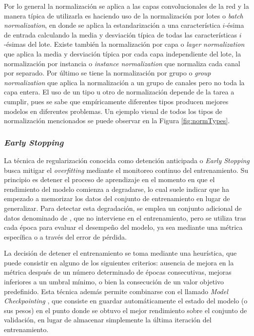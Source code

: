Por lo general la normalización se aplica a las capas convolucionales de la red y la manera típica de utilizarla es haciendo uso de la normalización por lotes o \textit{batch normalization}, en donde se aplica la estandarización a una característica $i$-ésima de entrada calculando la media y desviación típica de todas las características $i$-ésimas del lote. Existe también la normalización por capa o \textit{layer normalization} que aplica la media y desviación típica por cada capa independiente del lote, la normalización por instancia o \textit{instance normalization} que normaliza cada canal por separado. Por último se tiene la normalización por grupo o \textit{group normalization} que aplica la normalización a un grupo de canales pero no toda la capa entera. El uso de un tipo u otro de normalización depende de la tarea a cumplir, pues se sabe que empíricamente diferentes tipos producen mejores modelos en diferentes problemas. Un ejemplo visual de todos los tipos de normalización mencionados se puede observar en la Figura \ref{fig:normTypes}. 

\subsubsection{\textit{Early Stopping}}
La técnica de regularización conocida como detención anticipada o \textit{Early Stopping} \cite{prechelt_early_1998} busca mitigar el \textit{overfitting} mediante el monitoreo continuo del entrenamiento. Su principio es detener el proceso de aprendizaje en el momento en que el rendimiento del modelo comienza a degradarse, lo cual suele indicar que ha empezado a memorizar los datos del conjunto de entrenamiento en lugar de generalizar. Para detectar esta degradación, se emplea un conjunto adicional de datos denominado de , que no interviene en el entrenamiento, pero se utiliza tras cada época para evaluar el desempeño del modelo, ya sea mediante una métrica específica o a través del error de pérdida.

La decisión de detener el entrenamiento se toma mediante una heurística, que puede consistir en alguno de los siguientes criterios: ausencia de mejora en la métrica después de un número determinado de épocas consecutivas, mejoras inferiores a un umbral mínimo, o bien la consecución de un valor objetivo predefinido. Esta técnica además permite combinarse con el llamado \textit{Model Checkpointing} \cite{geron_hands-machine_2019}, que consiste en guardar automáticamente el estado del modelo (o sus pesos) en el punto donde se obtuvo el mejor rendimiento sobre el conjunto de validación, en lugar de almacenar simplemente la última iteración del entrenamiento.

